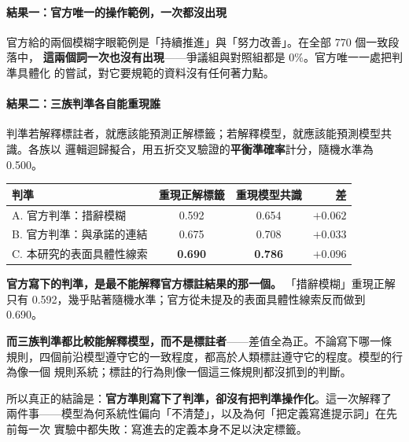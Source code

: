 \documentclass[11pt,a4paper]{ctexart}
\begin{document}
\paragraph{結果一：官方唯一的操作範例，一次都沒出現}\mbox{}\par

\begin{tcolorbox}[colback=yellow!12, colframe=yellow!60!black]
官方給的兩個模糊字眼範例是「持續推進」與「努力改善」。在全部 770 個一致段落中，
\textbf{這兩個詞一次也沒有出現}——爭議組與對照組都是 0\%。官方唯一一處把判準具體化
的嘗試，對它要規範的資料沒有任何著力點。
\end{tcolorbox}

\paragraph{結果二：三族判準各自能重現誰}

判準若解釋標註者，就應該能預測正解標籤；若解釋模型，就應該能預測模型共識。各族以
邏輯迴歸擬合，用五折交叉驗證的\textbf{平衡準確率}計分，隨機水準為 0.500。

\begin{table}[h]
\centering\small
\begin{tabular}{@{}lccr@{}}
\toprule
判準 & 重現正解標籤 & 重現模型共識 & 差 \\
\midrule
A. 官方判準：措辭模糊 & 0.592 & 0.654 & $+0.062$ \\
B. 官方判準：與承諾的連結 & 0.675 & 0.708 & $+0.033$ \\
\rowcolor{yellow!15}
C. 本研究的表面具體性線索 & \textbf{0.690} & \textbf{0.786} & $\mathbf{+0.096}$ \\
\bottomrule
\end{tabular}
\end{table}

\begin{tcolorbox}[colback=green!5, colframe=green!45, title=結論：誰都不必錯]
\textbf{官方寫下的判準，是最不能解釋官方標註結果的那一個。} 「措辭模糊」重現正解
只有 0.592，幾乎貼著隨機水準；官方從未提及的表面具體性線索反而做到 0.690。

\medskip
\textbf{而三族判準都比較能解釋模型，而不是標註者}——差值全為正。不論寫下哪一條
規則，四個前沿模型遵守它的一致程度，都高於人類標註遵守它的程度。模型的行為像一個
規則系統；標註的行為則像一個這三條規則都沒抓到的判斷。

\medskip
所以真正的結論是：\textbf{官方準則寫下了判準，卻沒有把判準操作化}。這一次解釋了
兩件事——模型為何系統性偏向「不清楚」，以及為何「把定義寫進提示詞」在先前每一次
實驗中都失敗：寫進去的定義本身不足以決定標籤。
\end{tcolorbox}
\end{document}
